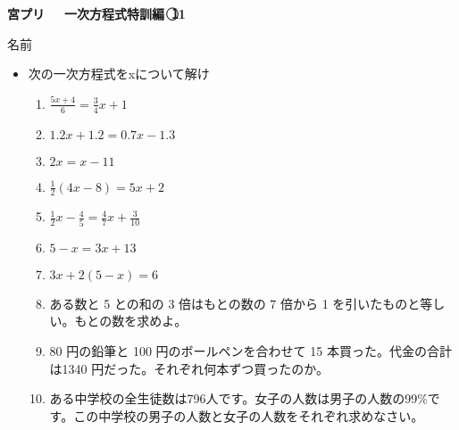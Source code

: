\documentclass[a4paper,fleqn,papersize,15pt]{jsarticle}
\begin{document}
\clearpage
 \begin{center}
   \LARGE\textbf{宮プリ　~一次方程式特訓編~\textcircled{\scriptsize 11}}
     \begin{flushright}
       名前\underline{\hspace{8zw}}
     \end{flushright}
 \end{center}

 \begin{itemize}
   \item 次の一次方程式をxについて解け
   \begin{enumerate}
\item $\frac{5x+4}{6} = \frac{3}{4}x+1$ \begin{flushright}\framebox[8em]{\rule{0pt}{6ex}}\end{flushright} %
\item $1.2x+1.2=0.7x-1.3$ \begin{flushright}\framebox[8em]{\rule{0pt}{6ex}}\end{flushright} %
\item $2x=x-11$ \begin{flushright}\framebox[8em]{\rule{0pt}{6ex}}\end{flushright} %
\item $\frac{1}{2}(4x-8)=5x+2$ \begin{flushright}\framebox[8em]{\rule{0pt}{6ex}}\end{flushright} %
\item $\frac{1}{2} x- \frac{4}{5} = \frac{4}{7} x+ \frac{3}{10}$ \begin{flushright}\framebox[8em]{\rule{0pt}{6ex}}\end{flushright} %
\item $5-x=3x+13$ \begin{flushright}\framebox[8em]{\rule{0pt}{6ex}}\end{flushright} %
\item $3x+2(5-x)=6$ \begin{flushright}\framebox[8em]{\rule{0pt}{6ex}}\end{flushright} %
\item ある数と 5 との和の 3 倍はもとの数の 7 倍から 1 を引いたものと等しい。もとの数を求めよ。 \vfill \begin{flushright}\framebox[8em]{\rule{0pt}{6ex}}\end{flushright} %
\item 80 円の鉛筆と 100 円のボールペンを合わせて 15 本買った。代金の合計は1340 円だった。それぞれ何本ずつ買ったのか。 \vfill \begin{flushright}\framebox[8em]{\rule{0pt}{6ex}}\end{flushright} %
\item ある中学校の全生徒数は796人です。女子の人数は男子の人数の99\%です。この中学校の男子の人数と女子の人数をそれぞれ求めなさい。 \vfill \begin{flushright}\framebox[8em]{\rule{0pt}{6ex}}\end{flushright} %
\end{enumerate}
    \vfill
\end{itemize}
\end{document}
